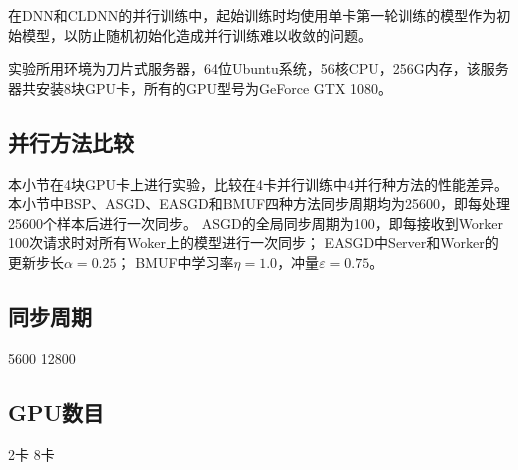 在DNN和CLDNN的并行训练中，起始训练时均使用单卡第一轮训练的模型作为初始模型，以防止随机初始化造成并行训练难以收敛的问题。

实验所用环境为刀片式服务器，64位Ubuntu系统，56核CPU，256G内存，该服务器共安装8块GPU卡，所有的GPU型号为GeForce GTX 1080。

\subsection{并行方法比较}

本小节在4块GPU卡上进行实验，比较在4卡并行训练中4并行种方法的性能差异。
本小节中BSP、ASGD、EASGD和BMUF四种方法同步周期均为25600，即每处理25600个样本后进行一次同步。
ASGD的全局同步周期为100，即每接收到Worker 100次请求时对所有Woker上的模型进行一次同步；
EASGD中Server和Worker的更新步长$\alpha=0.25$；
BMUF中学习率$\eta=1.0$，冲量$\varepsilon=0.75$。

\subsection{同步周期}

5600 12800 

\subsection{GPU数目}

2卡 8卡


